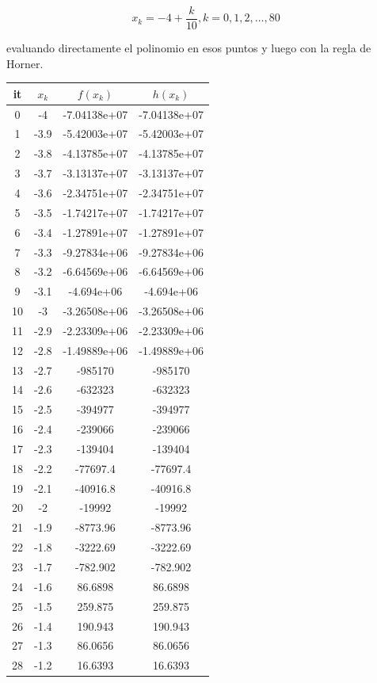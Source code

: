 \documentclass{article} %
\begin{document}
\begin{equation*}
    x_k = -4+\frac{k}{10}, k=0,1,2,\ldots,80
\end{equation*}

evaluando directamente el polinomio en esos puntos y luego con la regla de Horner.

\begin{center}
\begin{tabular}{|c|c|c|c|}
\hline
it & $x_k$ & $f(x_k)$ & $h(x_k)$\\
\hline
0 & -4 & -7.04138e+07 & -7.04138e+07\\
1 & -3.9 & -5.42003e+07 & -5.42003e+07\\
2 & -3.8 & -4.13785e+07 & -4.13785e+07\\
3 & -3.7 & -3.13137e+07 & -3.13137e+07\\
4 & -3.6 & -2.34751e+07 & -2.34751e+07\\
5 & -3.5 & -1.74217e+07 & -1.74217e+07\\
6 & -3.4 & -1.27891e+07 & -1.27891e+07\\
7 & -3.3 & -9.27834e+06 & -9.27834e+06\\
8 & -3.2 & -6.64569e+06 & -6.64569e+06\\
9 & -3.1 & -4.694e+06 & -4.694e+06\\
10 & -3 & -3.26508e+06 & -3.26508e+06\\
11 & -2.9 & -2.23309e+06 & -2.23309e+06\\
12 & -2.8 & -1.49889e+06 & -1.49889e+06\\
13 & -2.7 & -985170 & -985170\\
14 & -2.6 & -632323 & -632323\\
15 & -2.5 & -394977 & -394977\\
16 & -2.4 & -239066 & -239066\\
17 & -2.3 & -139404 & -139404\\
18 & -2.2 & -77697.4 & -77697.4\\
19 & -2.1 & -40916.8 & -40916.8\\
20 & -2 & -19992 & -19992\\
21 & -1.9 & -8773.96 & -8773.96\\
22 & -1.8 & -3222.69 & -3222.69\\
23 & -1.7 & -782.902 & -782.902\\
24 & -1.6 & 86.6898 & 86.6898\\
25 & -1.5 & 259.875 & 259.875\\
26 & -1.4 & 190.943 & 190.943\\
27 & -1.3 & 86.0656 & 86.0656\\
28 & -1.2 & 16.6393 & 16.6393\\
\end{tabular}
\end{center}
\end{document}
